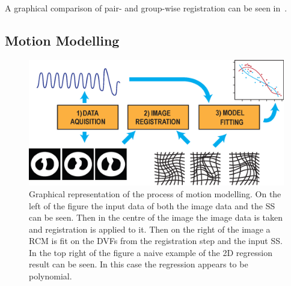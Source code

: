             A graphical comparison of pair- and group-wise registration can be seen in~.
            
        \subsection{Motion Modelling} \label{sec:motion_modelling}
            \begin{figure}
                \centering
                        
                \includegraphics[width=1.0\linewidth]{figures/background_motion_model.png}
                        
                \captionsetup{singlelinecheck=false}
                \caption{
                    Graphical representation of the process of motion modelling. On the left of the figure the input data of both the image data and the \gls{SS} can be seen. Then in the centre of the image the image data is taken and registration is applied to it. Then on the right of the image a \gls{RCM} is fit on the \glspl{DVF} from the registration step and the input \gls{SS}. In the top right of the figure a naive example of the \gls{2D} regression result can be seen. In this case the regression appears to be polynomial.
                }
                \label{fig:motion_modelling_motion_model}
            \end{figure}
            
